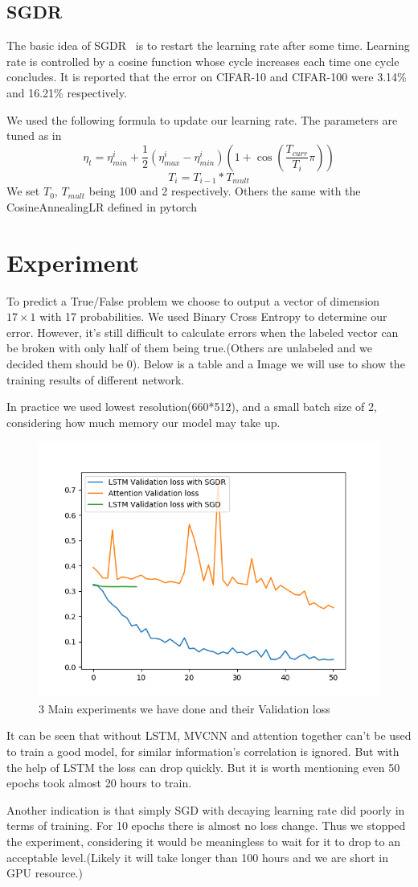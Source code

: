 \documentclass[conference,compsoc]{IEEEtran}
\begin{document}
\subsection{SGDR}
The basic idea of SGDR~\cite{SGDR} is to restart the learning rate after some time. Learning rate is controlled by a cosine function whose cycle increases each time one cycle concludes. It is reported that the error on CIFAR-10 and CIFAR-100 were 3.14\% and 16.21\% respectively.
\par We used the following formula to update our learning rate. The parameters are tuned as in \cite{SGDR}
$$ \eta_t = \eta_{min}^i + \frac{1}{2}(\eta_{max}^i-\eta_{min}^i)(1 + \cos(\frac{T_{curr}}{T_i}\pi))$$
$$ T_{i} = T_{i-1} * T_{mult} $$
We set $T_0$, $T_{mult}$ being 100 and 2 respectively. Others the same with the CosineAnnealingLR defined in pytorch


\section{Experiment}
To predict a True/False problem we choose to output a vector of dimension $17 \times 1$ with 17 probabilities. 
We used Binary Cross Entropy to determine our error. However, it's still difficult to calculate errors when the labeled vector can be broken with only half of them being true.(Others are unlabeled and we decided them should be 0).
Below is a table and a Image we will use to show the training results of different network.
\par In practice we used lowest resolution(660*512), and a small batch size of 2, considering how much memory our model may take up.  
\begin{figure}[!tp]
	\includegraphics[width=.5\textwidth]{../Pic/3models}
	\caption{3 Main experiments we have done and their Validation loss}
\end{figure}
\par
It can be seen that without LSTM, MVCNN and attention together can't be used to train a good model, for similar information's correlation is ignored. But with the help of LSTM the loss can drop quickly. But it is worth mentioning even 50 epochs took almost 20 hours to train.
\par
Another indication is that simply SGD with decaying learning rate did poorly in terms of training. For 10 epochs there is almost no loss change. Thus we stopped the experiment, considering it would be meaningless to wait for it to drop to an acceptable level.(Likely it will take longer than 100 hours and we are short in GPU resource.)
\end{document}
